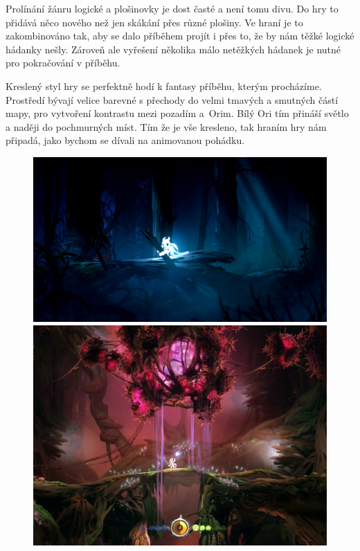 \documentclass[a4paper,10pt,english]{article}
\begin{document}
Prolínání žánru logické a plošinovky je dost časté a není tomu divu. Do hry to přidává něco nového než jen skákání přes různé plošiny. Ve hraní je to zakombinováno tak, aby se dalo příběhem projít i přes to, že by nám těžké logické hádanky nešly. Zároveň ale vyřešení několika málo netěžkých hádanek je nutné pro pokračování v příběhu.

Kreslený styl hry se perfektně hodí k fantasy příběhu, kterým procházíme. Prostředí bývají velice barevné s přechody do velmi tmavých a smutných částí mapy, pro vytvoření kontrastu mezi pozadím a~Orim. Bílý Ori tím přináší světlo a naději do pochmurných míst. Tím že je vše kresleno, tak hraním hry nám připadá, jako bychom se dívali na animovanou pohádku.

\begin{figure}
  \centering
  \includegraphics[width=0.49\linewidth]{img/ori_tmave.jpg}
  \includegraphics[width=0.49\linewidth]{img/ori.jpg}
\end{figure}
\end{document}
